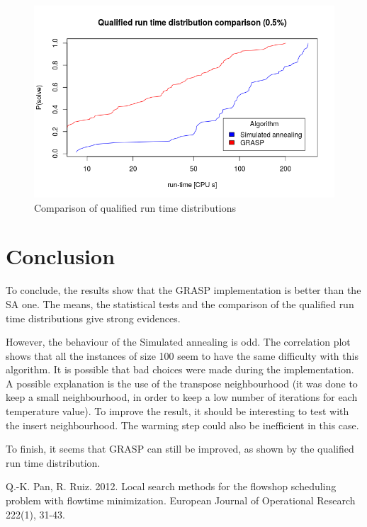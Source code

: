 \documentclass{article}
\begin{document}
\begin{figure}
    \centering
        \includegraphics[scale=0.5]{images/rt_comp}
    \caption{Comparison of qualified run time distributions}
    \label{fig:rt_comp}
\end{figure}


\section{Conclusion}

To conclude, the results show that the GRASP implementation is better than the SA one.
The means, the statistical tests and the comparison of the qualified run time distributions give strong evidences.\newline

However, the behaviour of the Simulated annealing is odd.
The correlation plot shows that all the instances of size 100 seem to have the same difficulty with this algorithm.
It is possible that bad choices were made during the implementation.
A possible explanation is the use of the transpose neighbourhood (it was done to keep a small neighbourhood, in order to keep a low number of iterations for each temperature value).
To improve the result, it should be interesting to test with the insert neighbourhood.
The warming step could also be inefficient in this case.\newline

To finish, it seems that GRASP can still be improved, as shown by the qualified run time distribution.


\begin{thebibliography}{12}

 Q.-K. Pan, R. Ruiz.
2012.
Local search methods for the flowshop scheduling problem with flowtime minimization.
European Journal of Operational Research 222(1), 31-43.

\end{thebibliography}
\end{document}
